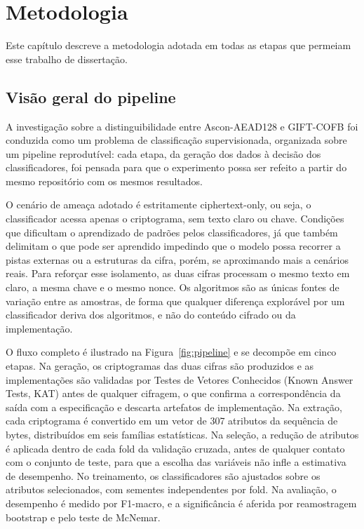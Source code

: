 \chapter{Metodologia}
\label{cap:metodologia}

Este capítulo descreve a metodologia adotada em todas as etapas que permeiam esse trabalho de dissertação.

\section{Visão geral do pipeline}


A investigação sobre a distinguibilidade entre Ascon-AEAD128 e GIFT-COFB foi conduzida como um problema de classificação supervisionada, organizada sobre um pipeline reprodutível: cada etapa, da geração dos dados à decisão dos classificadores, foi pensada para que o experimento possa ser refeito a partir do mesmo repositório com os mesmos resultados.

O cenário de ameaça adotado é estritamente ciphertext-only, ou seja, o classificador acessa apenas o criptograma, sem texto claro ou chave. Condições que dificultam o aprendizado de padrões pelos classificadores, já que também delimitam o que pode ser aprendido impedindo que o modelo possa recorrer a pistas externas ou a estruturas da cifra, porém, se aproximando mais a cenários reais. Para reforçar esse isolamento, as duas cifras processam o mesmo texto em claro, a mesma chave e o mesmo nonce. Os algoritmos são as únicas fontes de variação entre as amostras, de forma que qualquer diferença explorável por um classificador deriva dos algoritmos, e não do conteúdo cifrado ou da implementação.

O fluxo completo é ilustrado na Figura~\ref{fig:pipeline} e se decompõe em cinco etapas. Na geração, os criptogramas das duas cifras são produzidos e as implementações são validadas por Testes de Vetores Conhecidos (Known Answer Tests, KAT) antes de qualquer cifragem, o que confirma a correspondência da saída com a especificação e descarta artefatos de implementação.
Na extração, cada criptograma é convertido em um vetor de 307 atributos da
sequência de bytes, distribuídos em seis famílias estatísticas. Na seleção, a redução de atributos é aplicada dentro de cada fold da validação cruzada, antes de qualquer contato com o conjunto de
teste, para que a escolha das variáveis não infle a estimativa de desempenho. No treinamento, os classificadores são ajustados sobre
os atributos selecionados, com sementes independentes por fold. Na avaliação, o desempenho é medido por F1-macro, e a
significância é aferida por reamostragem bootstrap e pelo teste de McNemar.

